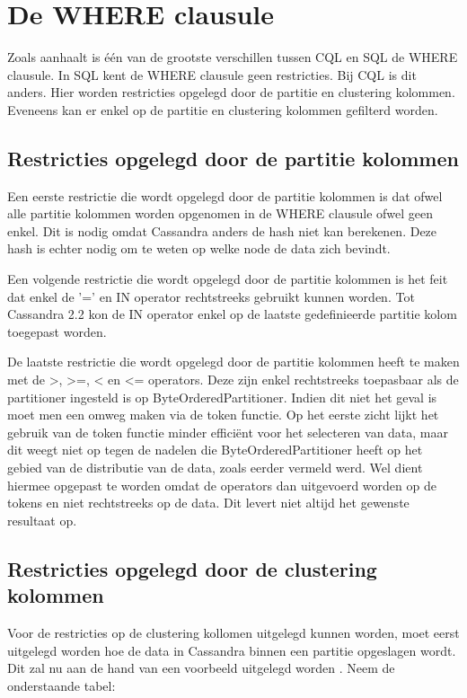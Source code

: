\section{De WHERE clausule}
Zoals \cite{Lerer2015Where} aanhaalt is één van de grootste verschillen tussen CQL en SQL de WHERE clausule.
In SQL kent de WHERE clausule geen restricties.
Bij CQL is dit anders.
Hier worden restricties opgelegd door de partitie en clustering kolommen.
Eveneens kan er enkel op de partitie en clustering kolommen gefilterd worden.

\subsection{Restricties opgelegd door de partitie kolommen}

Een eerste restrictie die wordt opgelegd door de partitie kolommen is dat ofwel alle partitie kolommen worden opgenomen in de WHERE clausule ofwel geen enkel.
Dit is nodig omdat Cassandra anders de hash niet kan berekenen.
Deze hash is echter nodig om te weten op welke node de data zich bevindt.

Een volgende restrictie die wordt opgelegd door de partitie kolommen is het feit dat enkel de '=' en IN operator rechtstreeks gebruikt kunnen worden.
Tot Cassandra 2.2 kon de IN operator enkel op de laatste gedefinieerde partitie kolom toegepast worden.

De laatste restrictie die wordt opgelegd door de partitie kolommen heeft te maken met de >, >=, < en <= operators.
Deze zijn enkel rechtstreeks toepasbaar als de partitioner ingesteld is op ByteOrderedPartitioner.
Indien dit niet het geval is moet men een omweg maken via de token functie.
Op het eerste zicht lijkt het gebruik van de token functie minder efficiënt voor het selecteren van data, maar dit weegt niet op tegen de nadelen die ByteOrderedPartitioner heeft op het gebied van de distributie van de data, zoals eerder vermeld werd.
Wel dient hiermee opgepast te worden omdat de operators dan uitgevoerd worden op de tokens en niet rechtstreeks op de data.
Dit levert niet altijd het gewenste resultaat op.

\subsection{Restricties opgelegd door de clustering kolommen}
Voor de restricties op de clustering kollomen uitgelegd kunnen worden, moet eerst uitgelegd worden hoe de data in Cassandra binnen een partitie opgeslagen wordt.
Dit zal nu aan de hand van een voorbeeld uitgelegd worden \citep{Lerer2015Where}.
Neem de onderstaande tabel:

